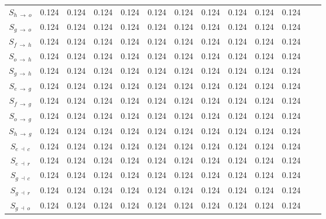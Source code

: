 \begin{ThreePartTable}
\begin{longtable}{c l *{10}{c} c}
        $S_{h \: \rightarrow \: o}$ & 0.124 &  0.124 &  0.124 &  0.124 &  0.124 &  0.124 &  0.124 &  0.124 &  0.124 &  0.124 \\
        
        $S_{g \: \rightarrow \: o}$ & 0.124 &  0.124 &  0.124 &  0.124 &  0.124 &  0.124 &  0.124 &  0.124 &  0.124 &  0.124 \\
        
        $S_{f \: \rightarrow \: h}$ & 0.124 &  0.124 &  0.124 &  0.124 &  0.124 &  0.124 &  0.124 &  0.124 &  0.124 &  0.124 \\
        
        $S_{o \: \rightarrow \: h}$ & 0.124 &  0.124 &  0.124 &  0.124 &  0.124 &  0.124 &  0.124 &  0.124 &  0.124 &  0.124 \\
        
        $S_{g \: \rightarrow \: h}$ & 0.124 &  0.124 &  0.124 &  0.124 &  0.124 &  0.124 &  0.124 &  0.124 &  0.124 &  0.124 \\
        
        $S_{e \: \rightarrow \: g}$ & 0.124 &  0.124 &  0.124 &  0.124 &  0.124 &  0.124 &  0.124 &  0.124 &  0.124 &  0.124 \\
        
        $S_{f \: \rightarrow \: g}$ & 0.124 &  0.124 &  0.124 &  0.124 &  0.124 &  0.124 &  0.124 &  0.124 &  0.124 &  0.124 \\
        
        $S_{o \: \rightarrow \: g}$ & 0.124 &  0.124 &  0.124 &  0.124 &  0.124 &  0.124 &  0.124 &  0.124 &  0.124 &  0.124 \\
        
        $S_{h \: \rightarrow \: g}$ & 0.124 &  0.124 &  0.124 &  0.124 &  0.124 &  0.124 &  0.124 &  0.124 &  0.124 &  0.124 \\
        
        $S_{e \: \dashv \: c}$ & 0.124 &  0.124 &  0.124 &  0.124 &  0.124 &  0.124 &  0.124 &  0.124 &  0.124 &  0.124 \\
        
        $S_{e \: \dashv \: r}$ & 0.124 &  0.124 &  0.124 &  0.124 &  0.124 &  0.124 &  0.124 &  0.124 &  0.124 &  0.124 \\
        
        $S_{g \: \dashv \: c}$ & 0.124 &  0.124 &  0.124 &  0.124 &  0.124 &  0.124 &  0.124 &  0.124 &  0.124 &  0.124 \\
        
        $S_{g \: \dashv \: r}$ & 0.124 &  0.124 &  0.124 &  0.124 &  0.124 &  0.124 &  0.124 &  0.124 &  0.124 &  0.124 \\
        
        $S_{g \: \dashv \: o}$ & 0.124 &  0.124 &  0.124 &  0.124 &  0.124 &  0.124 &  0.124 &  0.124 &  0.124 &  0.124 \\
    \end{longtable}
\end{ThreePartTable}


